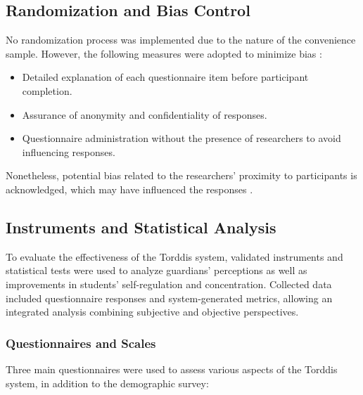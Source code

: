                 \subsection{Randomization and Bias Control}
                No randomization process was implemented due to the nature of the convenience sample. However, the following measures were adopted to minimize bias \citep{Huang2025How}:
                
                \begin{itemize}
                    \item Detailed explanation of each questionnaire item before participant completion.
                    
                    \item Assurance of anonymity and confidentiality of responses.
                    
                    \item Questionnaire administration without the presence of researchers to avoid influencing responses.
                \end{itemize}
                
                Nonetheless, potential bias related to the researchers’ proximity to participants is acknowledged, which may have influenced the responses \citep{DiPietro2025Meta}.
                
                \subsection{Instruments and Statistical Analysis}
                To evaluate the effectiveness of the Torddis system, validated instruments and statistical tests were used to analyze guardians’ perceptions as well as improvements in students’ self-regulation and concentration. Collected data included questionnaire responses and system-generated metrics, allowing an integrated analysis combining subjective and objective perspectives.
                
                \subsubsection{Questionnaires and Scales}
                Three main questionnaires were used to assess various aspects of the Torddis system, in addition to the demographic survey:
                
